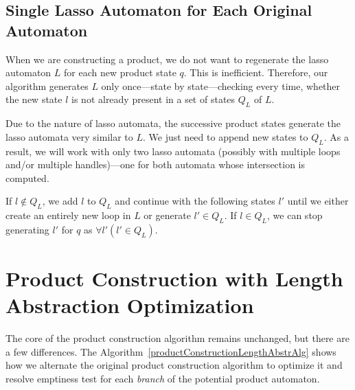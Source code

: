 \subsection{Single Lasso Automaton for Each Original Automaton}\label{sec:singleHaL}

When we are constructing a product, we do not want to regenerate the lasso  automaton $L$ for each new product state $q$. This is inefficient. Therefore, our algorithm generates $L$ only once---state by state---checking every time, whether the new state $l$ is not already present in a set of states $Q_L$ of $L$.

Due to the nature of lasso automata, the successive product states generate the lasso automata very similar to $L$. We just need to append new states to $Q_L$. As a result, we will work with only two lasso automata (possibly with multiple loops and/or multiple handles)---one for both automata whose intersection is computed.

If $l \notin Q_L$, we add $l$ to $Q_L$ and continue with the following states $l'$ until we either create an entirely new loop in $L$ or generate $l' \in Q_L$. If $l \in Q_L$, we can stop generating $l'$ for $q$ as $\forall l' ( l' \in Q_L)$.

\section{Product Construction with Length Abstraction Optimization}

The core of the product construction algorithm remains unchanged, but there are a few differences. The Algorithm~\ref{productConstructionLengthAbstrAlg} shows how we alternate the original product construction algorithm to optimize it and resolve emptiness test for each \emph{branch} of the potential product automaton.

